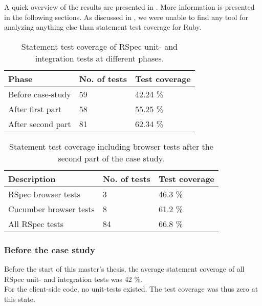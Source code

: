 \label{sec:results_coverage}

A quick overview of the results are presented in
. More information is presented in the following
sections. As discussed in , we were unable
to find any tool for analyzing anything else than statement test
coverage for Ruby.\\

\begin{table}[t]
    \centering
    \begin{tabular}{l l l}
        Phase & No. of tests & Test coverage\\
        \hline
        Before case-study &       59 & 42.24 \%\\
        After first part  &       58 & 55.25 \%\\
        After second part &       81 & 62.34 \%\\
    \end{tabular}
    \caption{ Statement test coverage of RSpec unit- and integration tests at different phases. }
    \label{tab:unit_coverage}
\end{table}

\begin{table}[t]
    \centering
    \begin{tabular}{l l l}
        Description & No. of tests & Test coverage\\
        \hline
        RSpec browser tests &     3 & 46.3 \%\\
        Cucumber browser tests &  8 & 61.2 \%\\
        All RSpec tests &        84 & 66.8 \%\\
    \end{tabular}
    \caption{ Statement test coverage including browser tests after the second part of the case study. }
    \label{tab:browser_coverage}
\end{table}

\subsubsection{Before the case study}

Before the start of this master's thesis, the average statement coverage
of all RSpec unit- and integration tests was 42 \%.\\

For the client-side code, no unit-tests existed. The test coverage was
thus zero at this state.\\


